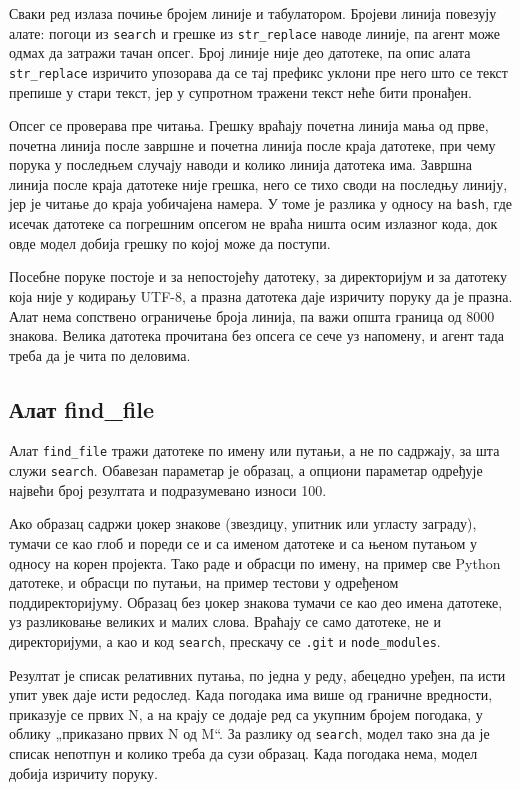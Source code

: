 \documentclass[12pt,a4paper]{report}
\begin{document}
	Сваки ред излаза почиње бројем линије и табулатором. Бројеви линија повезују
	алате: погоци из \texttt{search} и грешке из \texttt{str\_replace} наводе
	линије, па агент може одмах да затражи тачан опсег. Број линије није део
	датотеке, па опис алата \texttt{str\_replace} изричито упозорава да се тај
	префикс уклони пре него што се текст препише у стари текст, јер у супротном
	тражени текст неће бити пронађен.

	Опсег се проверава пре читања. Грешку враћају почетна линија мања од прве,
	почетна линија после завршне и почетна линија после краја датотеке, при чему
	порука у последњем случају наводи и колико линија датотека има. Завршна
	линија после краја датотеке није грешка, него се тихо своди на последњу
	линију, јер је читање до краја уобичајена намера. У томе је разлика у односу
	на \texttt{bash}, где исечак датотеке са погрешним опсегом не враћа ништа
	осим излазног кода, док овде модел добија грешку по којој може да поступи.

	Посебне поруке постоје и за непостојећу датотеку, за директоријум и за
	датотеку која није у кодирању UTF-8, а празна датотека даје изричиту поруку
	да је празна. Алат нема сопствено ограничење броја линија, па важи општа
	граница од 8000 знакова. Велика датотека прочитана без опсега се сече уз
	напомену, и агент тада треба да је чита по деловима.

	\subsection{Алат find\_file}

	Алат \texttt{find\_file} тражи датотеке по имену или путањи, а не по
	садржају, за шта служи \texttt{search}. Обавезан параметар је образац, а
	опциони параметар одређује највећи број резултата и подразумевано износи
	100.

	Ако образац садржи џокер знакове (звездицу, упитник или угласту заграду),
	тумачи се као глоб и пореди се и са именом датотеке и са њеном путањом у
	односу на корен пројекта. Тако раде и обрасци по имену, на пример све Python
	датотеке, и обрасци по путањи, на пример тестови у одређеном
	поддиректоријуму. Образац без џокер знакова тумачи се као део имена
	датотеке, уз разликовање великих и малих слова. Враћају се само датотеке, не
	и директоријуми, а као и код \texttt{search}, прескачу се \texttt{.git} и
	\texttt{node\_modules}.

	Резултат је списак релативних путања, по једна у реду, абецедно уређен, па
	исти упит увек даје исти редослед. Када погодака има више од граничне
	вредности, приказује се првих N, а на крају се додаје ред са укупним бројем
	погодака, у облику „приказано првих N од M“. За разлику од \texttt{search},
	модел тако зна да је списак непотпун и колико треба да сузи образац. Када
	погодака нема, модел добија изричиту поруку.
\end{document}

